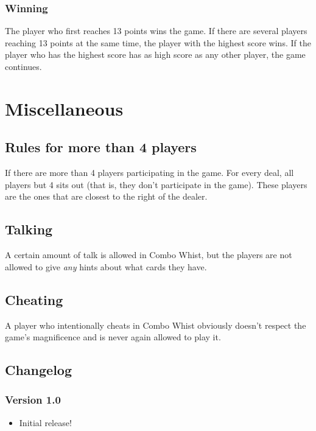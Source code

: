 \documentclass[a4paper]{article}
\begin{document}
			\subsubsection{Winning}
			The player who first reaches 13 points wins the game. If there are several players reaching 13 points at the same time, the player with the highest score wins. If the player who has the highest score has as high score as any other player, the game continues.
			
	\section{Miscellaneous}
		\subsection{Rules for more than 4 players}
		If there are more than 4 players participating in the game. For every deal, all players but 4 sits out (that is, they don't participate in the game). These players are the ones that are closest to the right of the dealer.
		
		
		
		\subsection{Talking}
		A certain amount of talk is allowed in Combo Whist, but the players are not allowed to give \emph{any} hints about what cards they have.
		
		\subsection{Cheating}
		A player who intentionally cheats in Combo Whist obviously doesn't respect the game's magnificence and is never again allowed to play it.
		
		\subsection{Changelog}
			\subsubsection{Version 1.0}
			\begin{itemize}
				\item Initial release!
			\end{itemize}
\end{document}
